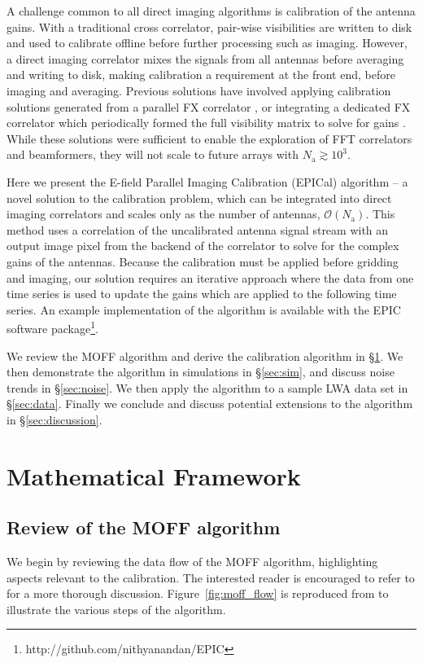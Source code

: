 \documentclass[a4paper,fleqn,usenatbib]{mnras}
\newcommand{\Nant}{\ensuremath{N_{\mathrm{a}}}}
\begin{document}
A challenge common to all direct imaging algorithms is calibration of the antenna gains. With a 
traditional cross correlator, pair-wise visibilities are written to disk and used to calibrate 
offline before further processing such as imaging. However, a direct imaging correlator mixes 
the signals from all antennas before averaging and writing to disk, making calibration a 
requirement at the front end, before imaging and averaging. Previous solutions have involved 
applying calibration solutions generated from a parallel FX correlator \citep{zhe14, fos14}, or 
integrating a dedicated FX correlator which periodically formed the full visibility matrix to solve 
for gains \citep{wij09,dev09}. While these solutions were sufficient to enable the exploration of 
FFT correlators and beamformers, they will not scale to future arrays with $\Nant \gtrsim 10^3$.

Here we present the E-field Parallel Imaging Calibration (EPICal) algorithm -- a novel solution 
to the calibration problem, which can be integrated into direct imaging correlators and scales 
only as the number of antennas, $\mathcal{O}(\Nant)$. This method uses a correlation of the 
uncalibrated antenna signal stream with an output image pixel from the backend of the 
correlator to solve for the complex gains of the antennas. Because the calibration must be 
applied before gridding and imaging, our solution requires an iterative approach where the data 
from one time series is used to update the gains which are applied to the following time series. 
An example implementation of the algorithm is available with the EPIC software 
package\footnote{http://github.com/nithyanandan/EPIC}.

We review the MOFF algorithm and derive the calibration algorithm in \S \ref{sec:math}. We 
then demonstrate the algorithm in simulations in \S \ref{sec:sim}, 
and discuss noise trends in \S \ref{sec:noise}. We then apply the algorithm to a sample LWA 
data set in \S \ref{sec:data}.
Finally we conclude and discuss potential extensions to the 
algorithm in \S \ref{sec:discussion}.

\section{Mathematical Framework}\label{sec:math}
\subsection{Review of the MOFF algorithm}
We begin by reviewing the data flow of the MOFF algorithm, highlighting aspects relevant to 
the calibration. The interested reader is encouraged to refer to \citealt{mor11} for a more 
thorough discussion. Figure~\ref{fig:moff_flow} is reproduced from \citealt{thy15c} to illustrate 
the various steps of the algorithm.
\end{document}
